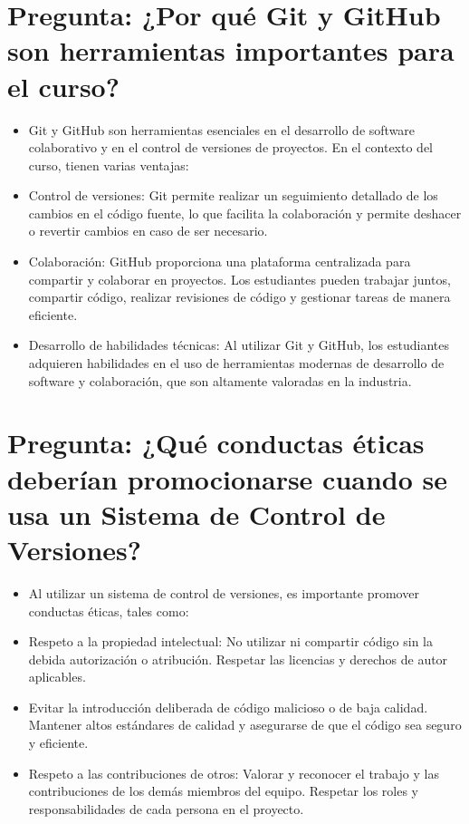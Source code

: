 \documentclass{article}
\begin{document}
\section{Pregunta: ¿Por qué Git y GitHub son herramientas importantes para el curso?}
	\begin{itemize}
		\item  Git y GitHub son herramientas esenciales en el desarrollo de software colaborativo y en el control de versiones de proyectos. En el contexto del curso, tienen varias ventajas:
		\item Control de versiones: Git permite realizar un seguimiento detallado de los cambios en el código fuente, lo que facilita la colaboración y permite deshacer o revertir cambios en caso de ser necesario.
		\item Colaboración: GitHub proporciona una plataforma centralizada para compartir y colaborar en proyectos. Los estudiantes pueden trabajar juntos, compartir código, realizar revisiones de código y gestionar tareas de manera eficiente.
		\item Desarrollo de habilidades técnicas: Al utilizar Git y GitHub, los estudiantes adquieren habilidades en el uso de herramientas modernas de desarrollo de software y colaboración, que son altamente valoradas en la industria.
	\end{itemize}	
	\section{Pregunta: ¿Qué conductas éticas deberían promocionarse cuando se usa un Sistema de Control de Versiones?}
	\begin{itemize}
		\item Al utilizar un sistema de control de versiones, es importante promover conductas éticas, tales como:
		\item Respeto a la propiedad intelectual: No utilizar ni compartir código sin la debida autorización o atribución. Respetar las licencias y derechos de autor aplicables.
		\item Evitar la introducción deliberada de código malicioso o de baja calidad. Mantener altos estándares de calidad y asegurarse de que el código sea seguro y eficiente.
		\item Respeto a las contribuciones de otros: Valorar y reconocer el trabajo y las contribuciones de los demás miembros del equipo. Respetar los roles y responsabilidades de cada persona en el proyecto.


	\end{itemize}	
\end{document}
